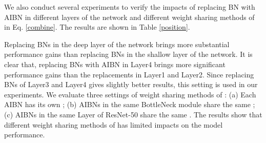 \documentclass[final]{cvpr}
\begin{document}
We also conduct several experiments to verify the impacts of replacing BN with AIBN in different layers of the network and different weight sharing methods of  in Eq. \eqref{combine}. The results are shown in Table \ref{position}.

Replacing BNs in the deep layer of the network brings more substantial performance gains than replacing BNs in the shallow layer of the network.
It is clear that, replacing BNs with AIBN in Layer4 brings more significant performance gains than the replacements in Layer1 and Layer2. 
Since replacing BNs of Layer3 and Layer4 gives slightly better results, this setting is used in our experiments.
We evaluate three settings of weight sharing methods of : (a) Each AIBN has its own ; (b) AIBNs in the same BottleNeck module share the same ; (c) AIBNs in the same Layer of ResNet-50 share the same .
The results show that different weight sharing methods of  has limited impacts on the model performance.
\end{document}
